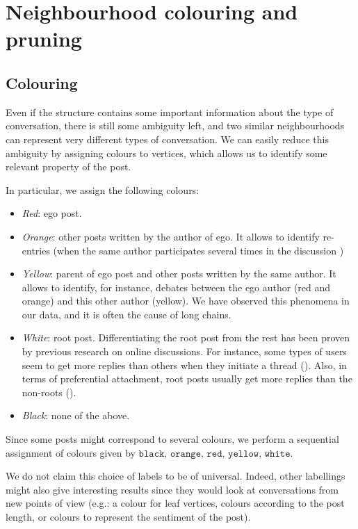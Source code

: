 \documentclass[conference]{IEEEtran}
\begin{document}
\section{Neighbourhood colouring and pruning}\label{sec:colouring_pruning}
\subsection{Colouring}
Even if the structure contains some important information about the type of conversation, there is still some ambiguity left, and two similar neighbourhoods can represent very different types of conversation. We can easily reduce this ambiguity by assigning colours to vertices, which allows us to identify some relevant property of the post. 

In particular, we assign the following colours:

\begin{itemize}
\item \textit{Red}: ego post.
\item \textit{Orange}: other posts written by the author of ego. It allows to identify re-entries (when the same author participates several times in the discussion \cite{Backstrom2013})
\item \textit{Yellow}: parent of ego post and other posts written by the same author. It allows to identify, for instance, debates between the ego author (red and orange) and this other author (yellow). We have observed this phenomena in our data, and it is often the cause of long chains.
\item \textit{White}: root post. Differentiating the root post from the rest has been proven by previous research on online discussions. For instance, some types of users seem to get more replies than others when they initiate a thread (\cite{Himelboim2009,  Lumbreras2013}). Also, in terms of preferential attachment, root posts usually get more replies than the non-roots (\cite{Gomez2010, Gomez2012}).
\item \textit{Black}: none of the above.
\end{itemize}
Since some posts might correspond to several colours, we perform a sequential assignment of colours given by $\texttt{black, orange, red, yellow, white}$. 

We do not claim this choice of labels to be of universal. Indeed, other labellings might also give interesting results since they would look at conversations from new points of view (e.g.: a colour for leaf vertices, colours according to the post length, or colours to represent the sentiment of the post). 
\end{document}
